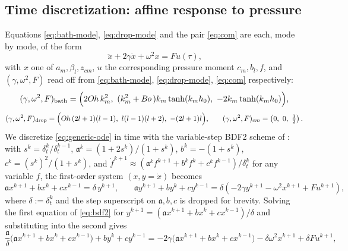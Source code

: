 \subsection{Time discretization: affine response to pressure}
\label{subsec:affine}

\hspace*{1em}Equations \eqref{eq:bath-mode}, \eqref{eq:drop-mode} and the pair \eqref{eq:com} are each, mode by mode, of the form
\begin{equation}
    \ddot x + 2\gamma\dot x+\omega^2x = Fu(\tau)\text{,}
    \label{eq:generic-ode}
\end{equation}
with $x$ one of $a_m,\beta_l,z_{cm}$, $u$ the corresponding pressure moment $c_m,b_l,f$, and $(\gamma,\omega^2,F)$ read off from \eqref{eq:bath-mode}, \eqref{eq:drop-mode}, \eqref{eq:com} respectively:
\begin{equation}
    (\gamma,\omega^2,F)_{\text{bath}} = \Big(2O\kern-0.04em h\, k_m^2,\ (k_m^2+B\kern-0.04em o\,)k_m\tanh(k_mh_0),\ -2k_m\tanh(k_mh_0)\Big)\text{,}
    \label{eq:bath-coeffs}
\end{equation}
\begin{equation}
    (\gamma,\omega^2,F)_{\text{drop}} = \Big(O\kern-0.04em h\,(2l+1)(l-1),\ l(l-1)(l+2),\ -(2l+1)l\Big)\text{,}\qquad
    (\gamma,\omega^2,F)_{cm} = \left(0,\ 0,\ \tfrac32\right)\text{.}
    \label{eq:drop-com-coeffs}
\end{equation}
We discretize \eqref{eq:generic-ode} in time with the variable-step BDF2 scheme of \cite{AgueroEtAl2026}: with $s^k=\delta_t^k/\delta_t^{k-1}$, $\mathfrak a^k=(1+2s^k)/(1+s^k)$, $b^k=-(1+s^k)$, $c^k=(s^k)^2/(1+s^k)$, and $\dot f^{k+1}\approx(\mathfrak a^kf^{k+1}+b^kf^k+c^kf^{k-1})/\delta_t^k$ for any variable $f$, the first-order system $(x,y{=}\dot x)$ becomes
\begin{equation}
    \mathfrak a x^{k+1}+bx^k+cx^{k-1} = \delta\, y^{k+1}\text{,}\qquad
    \mathfrak a y^{k+1}+by^k+cy^{k-1} = \delta\left(-2\gamma y^{k+1}-\omega^2x^{k+1}+Fu^{k+1}\right)\text{,}
    \label{eq:bdf2}
\end{equation}
where $\delta:=\delta_t^k$ and the step superscript on $\mathfrak a,b,c$ is dropped for brevity. Solving the first equation of \eqref{eq:bdf2} for $y^{k+1}=(\mathfrak a x^{k+1}+bx^k+cx^{k-1})/\delta$ and substituting into the second gives
\begin{equation}
    \frac{\mathfrak a}{\delta}\Big(\mathfrak a x^{k+1}+bx^k+cx^{k-1}\Big)+by^k+cy^{k-1}
    = -2\gamma\Big(\mathfrak a x^{k+1}+bx^k+cx^{k-1}\Big)-\delta\omega^2x^{k+1}+\delta Fu^{k+1}\text{,}
\end{equation}
